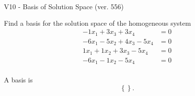 \begin{exercise}
  \begin{exerciseTitle}V10 - Basis of Solution Space (ver. 556)\end{exerciseTitle}
  \begin{exerciseStatement}
    Find a basis for the solution space of the homogeneous system 
\begin{align*}
 -1 x_ 1 + 3 x_ 3 + 3 x_ 4 &= 0  \\ 
  -6 x_ 1 -5 x_ 2 + 4 x_ 3 -5 x_ 4 &= 0  \\ 
  1 x_ 1 + 1 x_ 2 + 3 x_ 3 -5 x_ 4 &= 0  \\ 
  -6 x_ 1 -1 x_ 2 -5 x_ 4 &= 0  \\ 
 \end{align*}


 
  \end{exerciseStatement}

  \begin{exerciseAnswer}
   A basis is   
\[\left\{\right\}.\]

  


  \end{exerciseAnswer}
\end{exercise}